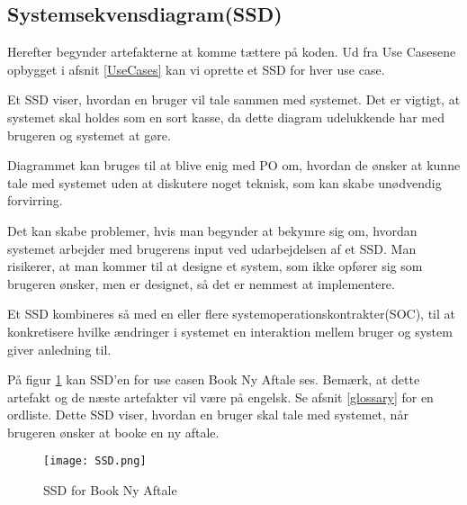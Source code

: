 \subsection{Systemsekvensdiagram(SSD)}
\label{SSD}

Herefter begynder artefakterne at komme tættere på koden.
Ud fra Use Casesene opbygget i afsnit \ref{UseCases} kan vi oprette et SSD for hver use case.

Et SSD viser, hvordan en bruger vil tale sammen med systemet.
Det er vigtigt, at systemet skal holdes som en sort kasse, da dette diagram udelukkende har med brugeren og systemet at gøre.

Diagrammet kan bruges til at blive enig med PO om, hvordan de ønsker at kunne tale med systemet uden at diskutere noget teknisk, som kan skabe unødvendig forvirring.

Det kan skabe problemer, hvis man begynder at bekymre sig om, hvordan systemet arbejder med brugerens input ved udarbejdelsen af et SSD.
Man risikerer, at man kommer til at designe et system, som ikke opfører sig som brugeren ønsker, men er designet, så det er nemmest at implementere.

Et SSD kombineres så med en eller flere systemoperationskontrakter(SOC), til at konkretisere hvilke ændringer i systemet en interaktion mellem bruger og system giver anledning til.

På figur \ref{forretning:ssd} kan SSD'en for use casen Book Ny Aftale ses.
Bemærk, at dette artefakt og de næste artefakter vil være på engelsk.
Se afsnit \ref{glossary} for en ordliste.
Dette SSD viser, hvordan en bruger skal tale med systemet, når brugeren ønsker at booke en ny aftale.

\begin{figure}[H]
    \caption{SSD for Book Ny Aftale}
    \centering
        \texttt{[image: SSD.png]}
    \label{forretning:ssd}
\end{figure}